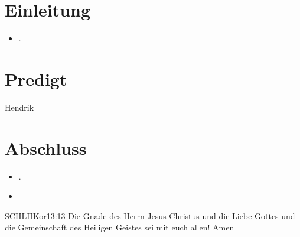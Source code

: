 \documentclass[fontsize=14pt]{mybib}
\newcommand{\Name}{Hendrik}
\begin{document}
\section{Einleitung}
  

\begin{itemize}
    \item {}.
\end{itemize}
\section{Predigt}
    \Name
\section{Abschluss}
\begin{itemize}
    \item {}.
    \item {}
\end{itemize}
\begin{bibelbox}{SCHL}{IIKor}{13:13}
    Die Gnade des Herrn Jesus Christus und die Liebe Gottes und die Gemeinschaft des Heiligen Geistes sei mit euch allen! Amen
\end{bibelbox}
\end{document}
